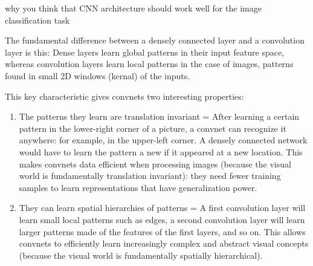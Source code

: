 \documentclass[11pt]{article}
\providecommand{\tightlist}{%
      \setlength{\itemsep}{0pt}\setlength{\parskip}{0pt}}
\begin{document}
why you think that CNN architecture should work well for the image
classification task

The fundamental difference between a densely connected layer and a
convolution layer is this: Dense layers learn global patterns in their
input feature space, whereas convolution layers learn local patterns in
the case of images, patterns found in small 2D windows (kernal) of the
inputs.

This key characteristic gives convnets two interesting properties:

\begin{enumerate}
\def\labelenumi{\alph{enumi})}
\tightlist
\item
  The patterns they learn are translation invariant = After learning a
  certain pattern in the lower-right corner of a picture, a convnet can
  recognize it anywhere: for example, in the upper-left corner. A
  densely connected network would have to learn the pattern a new if it
  appeared at a new location. This makes convnets data efficient when
  processing images (because the visual world is fundamentally
  translation invariant): they need fewer training samples to learn
  representations that have generalization power.
\item
  They can learn spatial hierarchies of patterns = A first convolution
  layer will learn small local patterns such as edges, a second
  convolution layer will learn larger patterns made of the features of
  the first layers, and so on. This allows convnets to efficiently learn
  increasingly complex and abstract visual concepts (because the visual
  world is fundamentally spatially hierarchical).
\end{enumerate}
\end{document}
